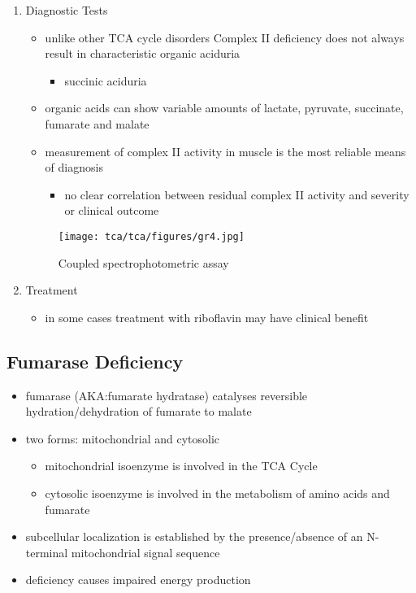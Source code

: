 \documentclass{scrartcl}
\begin{document}
\begin{enumerate}
\item Diagnostic Tests
\label{sec:orgbaa41e5}
\begin{itemize}
\item unlike other TCA cycle disorders Complex II deficiency does not always
result in characteristic organic aciduria
\begin{itemize}
\item succinic aciduria
\end{itemize}
\item organic acids can show variable amounts of lactate, pyruvate, succinate, fumarate and malate
\item measurement of complex II activity in muscle is the most reliable
means of diagnosis
\begin{itemize}
\item no clear correlation between residual complex II activity and
severity or clinical outcome
\end{itemize}
\end{itemize}

\begin{figure}[htbp]
\centering
\texttt{[image: tca/tca/figures/gr4.jpg]}
\caption{\label{fig:org3afac95}Coupled spectrophotometric assay}
\end{figure}

\item Treatment
\label{sec:org3ca1a95}
\begin{itemize}
\item in some cases treatment with riboflavin may have clinical benefit
\end{itemize}
\end{enumerate}


\subsection{Fumarase Deficiency}
\label{sec:org938530d}
\begin{itemize}
\item fumarase (AKA:fumarate hydratase) catalyses reversible
hydration/dehydration of fumarate to malate
\end{itemize}
\begin{itemize}
\item two forms: mitochondrial and cytosolic
\begin{itemize}
\item mitochondrial isoenzyme is involved in the TCA Cycle
\item cytosolic isoenzyme is involved in the metabolism of amino acids and fumarate
\end{itemize}
\item subcellular localization is established by the presence/absence of an N-terminal mitochondrial signal
sequence
\item deficiency causes impaired energy production
\end{itemize}
\end{document}
